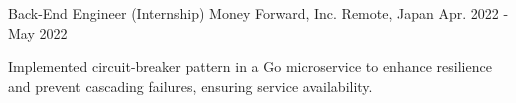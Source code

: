 \begin{cventries}
  \vspace{4.0mm}
  \cventry
    {Back-End Engineer (Internship)} %
    {Money Forward, Inc.} %
    {Remote, Japan} %
    {Apr. 2022 - May 2022} %
    {
      \begin{cvjobdesc}
        Implemented circuit-breaker pattern in a Go microservice to enhance resilience and prevent cascading failures, ensuring service availability.
      \end{cvjobdesc}
    }



\end{cventries}

